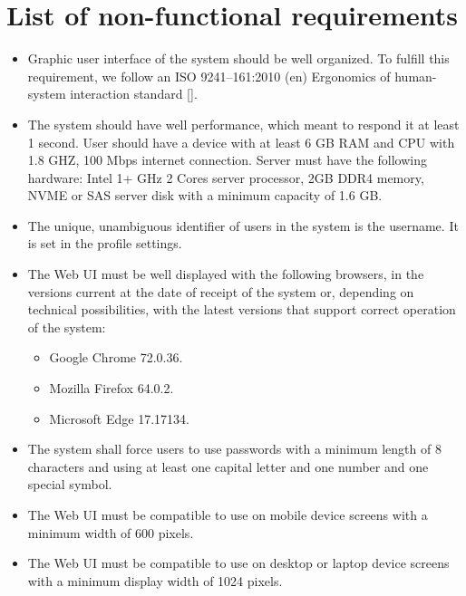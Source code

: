 \chapter*{List of non-functional requirements}\label{ch:list-of-non-functional-requirements}
\begin{itemize}
    \item Graphic user interface of the system should be well organized.
    To fulfill this requirement, we follow an ISO 9241--161:2010 (en) Ergonomics of human-system interaction
    standard [\cite{iso2010ergonomics}].
    \item The system should have well performance, which meant to respond it at least 1 second.
    User should have a device with at least 6 GB RAM and CPU with 1.8 GHZ, 100 Mbps internet connection.
    Server must have the following hardware: Intel 1+ GHz 2 Cores server processor, 2GB DDR4 memory, NVME or SAS
    server disk with a minimum capacity of 1.6 GB\@.
    \item The unique, unambiguous identifier of users in the system is the username.
    It is set in the profile settings.
    \item The Web UI must be well displayed with the following browsers, in the versions
    current at the date of receipt of the system or, depending on technical possibilities,
    with the latest versions that support correct operation of the system:
    \begin{itemize}
        \item Google Chrome 72.0.36.
        \item Mozilla Firefox 64.0.2.
        \item Microsoft Edge 17.17134.
    \end{itemize}
    \item The system shall force users to use passwords with a minimum length of 8
    characters and using at least one capital letter and one number and one special symbol.
    \item The Web UI must be compatible to use on mobile device screens with a minimum
    width of 600 pixels.
    \item The Web UI must be compatible to use on desktop or laptop device screens with a
    minimum display width of 1024 pixels.
\end{itemize}